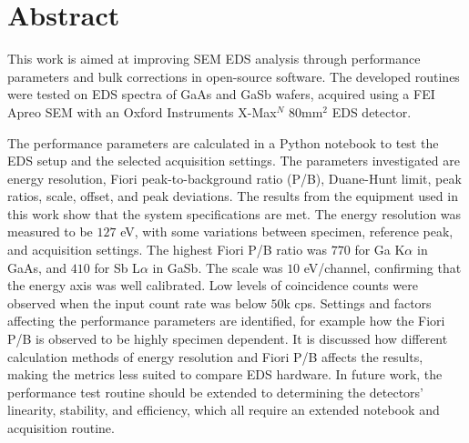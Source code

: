 \chapter*{Abstract}

\label{ch:abstract}

This work is aimed at improving SEM EDS analysis through performance parameters and bulk corrections in open-source software.
The developed routines were tested on EDS spectra of GaAs and GaSb wafers, acquired using a FEI Apreo SEM with an Oxford Instruments X-Max$^N$ $80$mm$^2$ EDS detector.

The performance parameters are calculated in a Python notebook to test the EDS setup and the selected acquisition settings.
The parameters investigated are energy resolution, Fiori peak-to-background ratio (P/B), Duane-Hunt limit, peak ratios, scale, offset, and peak deviations.
The results from the equipment used in this work show that the system specifications are met.
The energy resolution was measured to be $127$ eV, with some variations between specimen, reference peak, and acquisition settings.
The highest Fiori P/B ratio was $770$ for Ga K$\alpha$ in GaAs, and $410$ for Sb L$\alpha$ in GaSb.
The scale was $10$ eV/channel, confirming that the energy axis was well calibrated.
Low levels of coincidence counts were observed when the input count rate was below $50$k cps.
Settings and factors affecting the performance parameters are identified, for example how the Fiori P/B is observed to be highly specimen dependent.
It is discussed how different calculation methods of energy resolution and Fiori P/B affects the results, making the metrics less suited to compare EDS hardware.
In future work, the performance test routine should be extended to determining the detectors' linearity, stability, and efficiency, which all require an extended notebook and acquisition routine.


